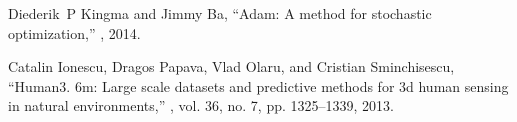 \documentclass{svproc}
\begin{document}
\begin{thebibliography}{10}
Diederik~P Kingma and Jimmy Ba,
\newblock ``Adam: A method for stochastic optimization,''
, 2014.

Catalin Ionescu, Dragos Papava, Vlad Olaru, and Cristian Sminchisescu,
\newblock ``Human3. 6m: Large scale datasets and predictive methods for 3d
  human sensing in natural environments,''
,
  vol. 36, no. 7, pp. 1325--1339, 2013.

\end{thebibliography}
\end{document}
